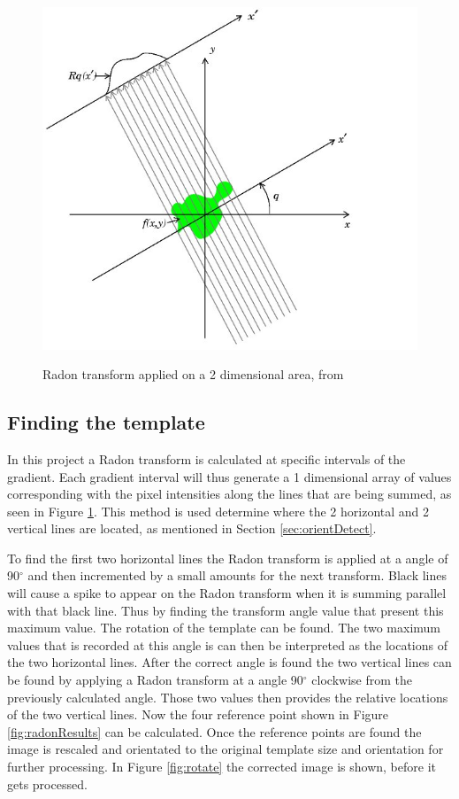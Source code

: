 \begin{figure}
  \centering
  \includegraphics[width=14cm]{RadonT}\\
  \caption{Radon transform applied on a 2 dimensional area, from \citet{radon}}
  \label{fig:RadonT}
\end{figure}

\subsection{Finding the template}
\label{sec:findTemplate}

In this project a Radon transform is calculated at specific intervals of the gradient. Each gradient interval will thus generate a 1 dimensional array of values corresponding with the pixel intensities along the lines that are being summed, as seen in Figure \ref{fig:RadonT}. This method is used determine where the 2 horizontal and 2 vertical lines are located, as mentioned in Section \ref{sec:orientDetect}. 

To find the first two horizontal lines the Radon transform is applied at a angle of 90$^{\circ}$ and then incremented by a small amounts for the next transform. Black lines will cause a spike to appear on the Radon transform when it is summing parallel with that black line. Thus by finding the transform angle value that present this maximum value. The rotation of the template can be found. The two maximum values that is recorded at this angle is can then be interpreted as the locations of the two horizontal lines. After the correct angle is found the two vertical lines can be found by applying a Radon transform at a angle 90$^{\circ}$ clockwise from the previously calculated angle. Those two values then provides the relative locations of the two vertical lines. Now the four reference point shown in Figure \ref{fig:radonResults} can be calculated. Once the reference points are found the image is rescaled and orientated to the original template size and orientation for further processing. In Figure \ref{fig:rotate} the corrected image is shown, before it gets processed.

